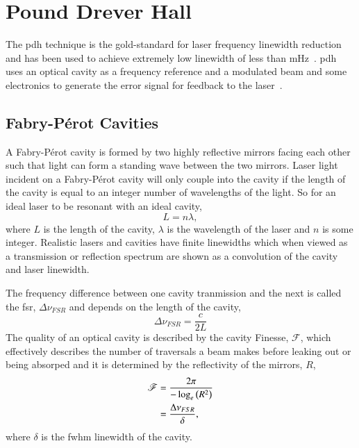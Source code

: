 \section{Pound Drever Hall}

The \gls{pdh} technique is the gold-standard for laser frequency linewidth reduction and has been used to achieve extremely low linewidth of less than \unit[40]{mHz}~\cite{kessler_sub-40-mhz-linewidth_2012}.
\Gls{pdh} uses an optical cavity as a frequency reference and a modulated beam and some electronics to generate the error signal for feedback to the laser~\cite{drever_laser_1983,black_introduction_2000}.

\subsection{Fabry-P\'erot Cavities}{
A Fabry-P\'erot cavity is formed by two highly reflective mirrors facing each other such that light can form a standing wave between the two mirrors.
Laser light incident on a Fabry-P\'erot cavity will only couple into the cavity if the length of the cavity is equal to an integer number of wavelengths of the light.
So for an ideal laser to be resonant with an ideal cavity,
\begin{equation}
L = n \lambda,
\end{equation}
where $L$ is the length of the cavity, $\lambda$ is the wavelength of the laser and $n$ is some integer.
Realistic lasers and cavities have finite linewidths which when viewed as a transmission or reflection spectrum are shown as a convolution of the cavity and laser linewidth.

The frequency difference between one cavity tranmission and the next is called the \gls{fsr}, $\Delta \nu_{FSR}$ and depends on the length of the cavity,
\begin{equation}
\Delta \nu_{FSR} = \frac{c}{2L}
\end{equation}
The quality of an optical cavity is described by the cavity Finesse, $\mathscr{F}$, which effectively describes the number of traversals a beam makes before leaking out or being absorped and it is determined by the reflectivity of the mirrors, $R$,
\begin{align}
\mathscr{F} &= \frac{2\pi}{-\log_e\left(R^2\right)} \notag\\
 &= \frac{\Delta \nu_{FSR}}{\delta},
\end{align}
where $\delta$ is the \gls{fwhm} linewidth of the cavity.

}
